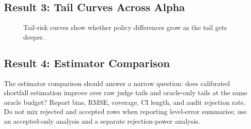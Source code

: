 \subsection{Result 3: Tail Curves Across Alpha}

\begin{figure}[t]
\centering
{}
\caption{Tail-risk curves show whether policy differences grow as the tail gets deeper.}
\label{fig:tail-curves}
\end{figure}

\subsection{Result 4: Estimator Comparison}

The estimator comparison should answer a narrow question: does calibrated shortfall estimation improve over raw judge tails and oracle-only tails at the same oracle budget? Report bias, RMSE, coverage, CI length, and audit rejection rate. Do not mix rejected and accepted rows when reporting level-error summaries; use an accepted-only analysis and a separate rejection-power analysis.

